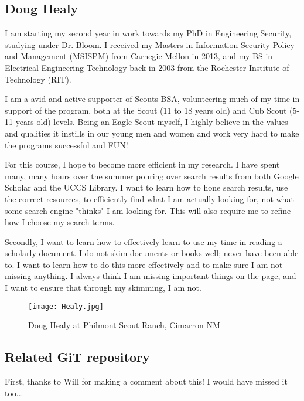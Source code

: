 \subsection{Doug Healy}

I am starting my second year in work towards my PhD in Engineering Security, studying under Dr. Bloom. I received my Masters in Information Security Policy and Management (MSISPM) from Carnegie Mellon in 2013, and my BS in Electrical Engineering Technology back in 2003 from the Rochester Institute of Technology (RIT). 

I am a avid and active supporter of Scouts BSA, volunteering much of my time in support of the program, both at the Scout (11 to 18 years old) and Cub Scout (5-11 years old) levels. Being an Eagle Scout myself, I highly believe in the values and qualities it instills in our young men and women and work very hard to make the programs successful and FUN!  

For this course, I hope to become more efficient in my research. I have spent many, many hours over the summer pouring over search results from both Google Scholar and the UCCS Library. I want to learn how to hone search results, use the correct resources, to efficiently find what I am actually looking for, not what some search engine "thinks" I am looking for. This will also require me to refine how I choose my search terms.  

Secondly, I want to learn how to effectively learn to use my time in reading a scholarly document. I do not skim documents or books well; never have been able to. I want to learn how to do this more effectively and to make sure I am not missing anything. I always think I am missing important things on the page, and I want to ensure that through my skimming, I am not.   

\begin{figure}[h]
    \centering
    \texttt{[image: Healy.jpg]}
    \caption{Doug Healy at Philmont Scout Ranch, Cimarron NM}
 \end{figure}
 
\subsection{Related GiT repository}
First, thanks to Will for making a comment about this! I would have missed it too...

